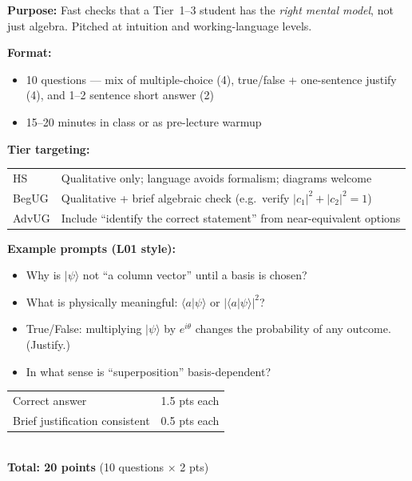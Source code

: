 \documentclass[11pt,a4paper]{article}
\begin{document}
\begin{tcolorbox}[ugconceptbox, title={SCQU --- Simple Concept Questions, Undergraduate \hfill\normalfont 10 questions}]

\textbf{Purpose:} Fast checks that a Tier~1--3 student has the \emph{right mental model},
not just algebra. Pitched at intuition and working-language levels.

\medskip\textbf{Format:}
\begin{itemize}[leftmargin=1.5em,itemsep=2pt]
  \item 10 questions --- mix of multiple-choice (4), true/false + one-sentence justify (4),
        and 1--2 sentence short answer (2)
  \item 15--20 minutes in class or as pre-lecture warmup
\end{itemize}

\medskip\textbf{Tier targeting:}
\begin{center}
\begin{tabular}{lp{9cm}}
\toprule
HS     & Qualitative only; language avoids formalism; diagrams welcome\\
BegUG  & Qualitative + brief algebraic check (e.g.\ verify $|c_1|^2+|c_2|^2=1$)\\
AdvUG  & Include ``identify the correct statement'' from near-equivalent options\\
\bottomrule
\end{tabular}
\end{center}

\medskip\textbf{Example prompts (L01 style):}
\begin{itemize}[leftmargin=1.5em,itemsep=2pt]
  \item Why is $|\psi\rangle$ not ``a column vector'' until a basis is chosen?
  \item What is physically meaningful: $\langle a|\psi\rangle$ or $|\langle a|\psi\rangle|^2$?
  \item True/False: multiplying $|\psi\rangle$ by $e^{i\theta}$ changes the probability of
        any outcome. (Justify.)
  \item In what sense is ``superposition'' basis-dependent?
\end{itemize}
\end{tcolorbox}

\begin{tcolorbox}[rubricbox, title={SCQU Rubric}]
\begin{tabular}{ll}
  Correct answer                & 1.5 pts each\\
  Brief justification consistent & 0.5 pts each\\
\end{tabular}\\[4pt]
\textbf{Total: 20 points} (10 questions $\times$ 2 pts)
\end{tcolorbox}
\end{document}
